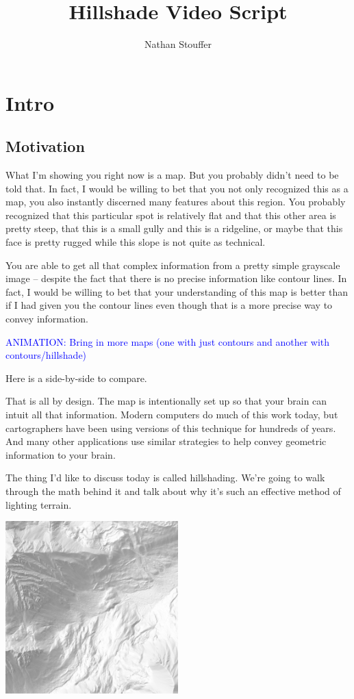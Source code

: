 \documentclass{article}
\newcommand\animation[1]{\textcolor{blue}{ANIMATION: #1}}
\begin{document}
	
\title{Hillshade Video Script}
\author{Nathan Stouffer}
\date{}
\maketitle

\section{Intro}

\subsection{Motivation}

What I'm showing you right now is a map.
But you probably didn't need to be told that.
In fact, I would be willing to bet that you not only recognized this as a map, you also instantly discerned many features about this region.
You probably recognized that this particular spot is relatively flat and that this other area is pretty steep, that this is a small gully and this is a ridgeline, or maybe that this face is pretty rugged while this slope is not quite as technical.

You are able to get all that complex information from a pretty simple grayscale image -- despite the fact that there is no precise information like contour lines.
In fact, I would be willing to bet that your understanding of this map is better than if I had given you the contour lines even though that is a more precise way to convey information.

\animation{Bring in more maps (one with just contours and another with contours/hillshade)}

Here is a side-by-side to compare.

That is all by design.
The map is intentionally set up so that your brain can intuit all that information.
Modern computers do much of this work today, but cartographers have been using versions of this technique for hundreds of years.
And many other applications use similar strategies to help convey geometric information to your brain.

The thing I'd like to discuss today is called hillshading.
We're going to walk through the math behind it and talk about why it's such an effective method of lighting terrain.

\begin{center}
	\includegraphics[width=0.5\textwidth,frame]{assets/hillshade-example.png}
\end{center}
\end{document}
